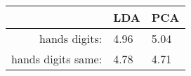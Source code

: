 \begin{tabular}{|r|l|l|}
  \hline
    & LDA & PCA \\
  \hline
  hands digits: & 4.96 & 5.04 \\
  \hline
  hands digits same: & 4.78 & 4.71 \\
  \hline
\end{tabular}
